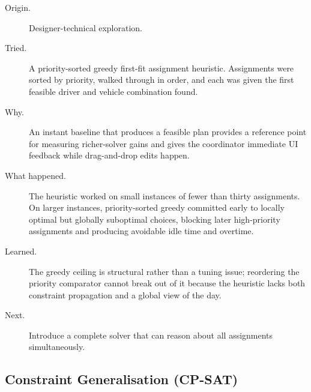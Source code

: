 \begin{description}
  \item[Origin.] Designer-technical exploration.
  \item[Tried.] A priority-sorted greedy first-fit assignment heuristic. Assignments were sorted by priority, walked through in order, and each was given the first feasible driver and vehicle combination found.
  \item[Why.] An instant baseline that produces a feasible plan provides a reference point for measuring richer-solver gains and gives the coordinator immediate UI feedback while drag-and-drop edits happen.
  \item[What happened.] The heuristic worked on small instances of fewer than thirty assignments. On larger instances, priority-sorted greedy committed early to locally optimal but globally suboptimal choices, blocking later high-priority assignments and producing avoidable idle time and overtime.
  \item[Learned.] The greedy ceiling is structural rather than a tuning issue; reordering the priority comparator cannot break out of it because the heuristic lacks both constraint propagation and a global view of the day.
  \item[Next.] Introduce a complete solver that can reason about all assignments simultaneously.
\end{description}

\subsection{Constraint Generalisation (CP-SAT)}
\label{sec:iter-cpsat}

